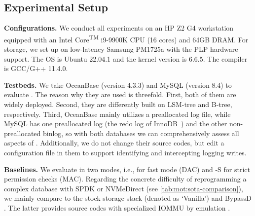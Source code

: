 \subsection{Experimental Setup}\label{sec:eval:setup}

{\bf Configurations.} We conduct  all experiments on an HP Z2 G4 workstation equipped with an Intel Core\textsuperscript{TM} i9-9900K CPU (16 cores) and 64GB DRAM. For storage, we set up  \odes on low-latency Samsung PM1725a with the PLP hardware support. 
The OS is Ubuntu 22.04.1 and the kernel version is 6.6.5.  %
 The  compiler is GCC/G++ 11.4.0.   

{\bf Testbeds.} %
We take %
OceanBase (version 4.3.3) and  MySQL (version 8.4) %
  to evaluate  \odes. The reason why they are used is threefold.
First, both of them are widely deployed.
Second, they are differently built on LSM-tree and B-tree, respectively. 
Third, %
OceanBase mainly utilizes a preallocated log file, while MySQL has one preallocated log  (the redo log of InnoDB~\cite{mysql2013mysql})
and the other non-preallocated binlog, so with both databases we can %
 comprehensively assess all aspects of \odes.
Additionally, we do not change their source codes, but edit a configuration file in them %
to support
 \odes  identifying and intercepting logging writes.



{\bf Baselines.} 
 We   evaluate \odes in two modes, i.e., \odes for fast mode (DAC) and \odes-S for strict permission checks (MAC).
Regarding the  concrete difficulty of reprogramming a complex database with SPDK or NVMeDirect (see \autoref{tab:mot:sota-comparison}),
we mainly  compare \odes to the stock storage  stack (denoted as `Vanilla') and  BypassD \cite{SSD:BypassD:ASPLOS-2024}.
The latter provides source codes with specialized IOMMU by emulation \cite{githubGitHubMultifacetBypassd}.

